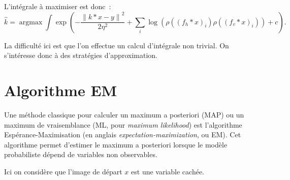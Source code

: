 \documentclass[french,a4paper]{article}
\theoremstyle{plain}
\theoremstyle{definition}
\theoremstyle{remark}
\DeclareMathOperator*{\argmax}{argmax}
\newcommand{\norm}[1]{\left\lVert #1 \right\rVert}
\begin{document}
L'intégrale à maximiser est donc~:
\[
\hat{k} = \argmax \int \exp\left( - \frac{\norm{k*x-y}^2}{2\eta^2} +  \sum_i \log\left(\rho((f_h*x)_i)\rho((f_v*x)_i)\right)  + c \right) .
\]

La difficulté ici est que l'on effectue un calcul d'intégrale non trivial. On s'intéresse donc à des stratégies d'approximation.

\section{Algorithme EM}
Une méthode classique pour calculer un maximum a posteriori (MAP) ou un maximum de vraisemblance (ML, pour \textit{maximum likelihood}) est l'algorithme Espérance-Maximisation (en anglais \textit{expectation-maximization}, ou EM). Cet algorithme permet d'estimer le maximum a posteriori lorsque le modèle probabiliste dépend de variables non observables.

Ici on considère que l'image de départ $x$ est une variable cachée. 





\end{document}
